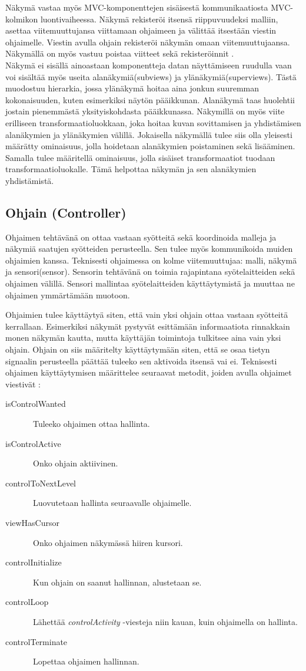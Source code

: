 \documentclass[finnish,utf8,nonumbib,palatino,kandi]{gradu2}
\begin{document}
Näkymä vastaa myös MVC-komponenttejen sisäisestä kommunikaatiosta MVC-kolmikon luontivaiheessa. Näkymä rekisteröi itsensä  riippuvuudeksi malliin, asettaa viitemuuttujansa viittamaan ohjaimeen ja välittää itsestään viestin ohjaimelle. Viestin avulla ohjain rekisteröi näkymän omaan viitemuuttujaansa. Näkymällä on myös vastuu poistaa viitteet sekä rekisteröinnit \cite{Burbeck}. \\
Näkymä ei sisällä ainoastaan komponentteja datan näyttämiseen ruudulla vaan voi sisältää myös useita alanäkymiä(subviews) ja ylänäkymiä(superviews). Tästä muodostuu hierarkia, jossa ylänäkymä hoitaa aina jonkun suuremman kokonaisuuden, kuten esimerkiksi näytön pääikkunan. Alanäkymä taas huolehtii jostain pienemmästä yksityiskohdasta pääikkunassa. Näkymillä on myös viite erilliseen transformaatioluokkaan, joka hoitaa kuvan sovittamisen ja yhdistämisen alanäkymien ja ylänäkymien välillä. Jokaisella näkymällä tulee siis olla yleisesti määrätty ominaisuus, jolla hoidetaan alanäkymien poistaminen sekä lisääminen. Samalla tulee määritellä ominaisuus, jolla sisäiset transformaatiot tuodaan transformaatioluokalle. Tämä helpottaa näkymän ja sen alanäkymien yhdistämistä\cite[s. 8]{Krasner:desc}.

\subsection{Ohjain (Controller)}
Ohjaimen tehtävänä on ottaa vastaan syötteitä sekä koordinoida malleja ja näkymiä saatujen syötteiden perusteella. Sen tulee myös kommunikoida muiden ohjaimien kanssa. Teknisesti ohjaimessa on kolme viitemuuttujaa: malli, näkymä ja sensori(sensor). Sensorin tehtävänä on toimia rajapintana syötelaitteiden sekä ohjaimen välillä. Sensori mallintaa syötelaitteiden käyttäytymistä ja muuttaa ne ohjaimen ymmärtämään muotoon.

Ohjaimien tulee käyttäytyä siten, että vain yksi ohjain ottaa vastaan syötteitä kerrallaan. Esimerkiksi näkymät pystyvät esittämään informaatiota rinnakkain monen näkymän kautta, mutta käyttäjän toimintoja tulkitsee aina vain yksi ohjain. Ohjain on siis määritelty käyttäytymään siten, että se osaa tietyn signaalin perusteella päättää tuleeko sen aktivoida itsensä vai ei. Teknisesti ohjaimen käyttäytymisen määrittelee seuraavat metodit, joiden avulla ohjaimet viestivät \cite[s. 9]{Krasner:desc}:
\begin{description}
\item[isControlWanted] \ Tuleeko ohjaimen ottaa hallinta.
\item[isControlActive] \ Onko ohjain aktiivinen.
\item[controlToNextLevel] \ Luovutetaan hallinta seuraavalle ohjaimelle.
\item[viewHasCursor] \ Onko ohjaimen näkymässä hiiren kursori.
\item[controlInitialize] \ Kun ohjain on saanut hallinnan, alustetaan se.
\item[controlLoop] \ Lähettää \emph{controlActivity} -viesteja niin kauan, kuin ohjaimella on hallinta.
\item[controlTerminate] \ Lopettaa ohjaimen hallinnan.
\end{description}
\end{document}
